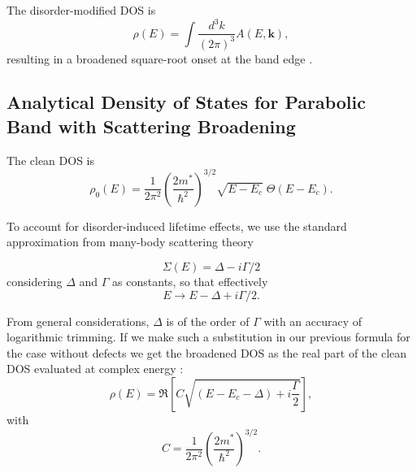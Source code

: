 

The disorder-modified DOS is
\begin{equation}
\rho(E) =
\int \frac{d^3 k}{(2\pi)^3} A(E,\mathbf{k}),
\end{equation}
resulting in a broadened square-root onset at the band edge \cite{YuCardona2010}.


\subsection{Analytical Density of States for Parabolic Band with Scattering Broadening}
\label{subsec:DOS_broadened}

The clean DOS is \cite{YuCardona2010}
\begin{equation}
\label{eq:rho0_clean}
\rho_0(E)
=
\frac{1}{2\pi^2}
\left( \frac{2 m^\ast}{\hbar^2} \right)^{3/2}
\sqrt{E - E_c}
\;\Theta(E - E_c).
\end{equation}

To account for disorder-induced lifetime effects, we use the standard approximation from many-body scattering theory 
\cite{Mahan2000,Economou2006}

\[
\Sigma(E) = \Delta - i \Gamma/2 
\]
considering $\Delta$ and $\Gamma$ as constants, so that effectively
\[
E \rightarrow E - \Delta + i \Gamma/2.
\]



From general considerations, $\Delta$ is of the order of $\Gamma$ with an accuracy of logarithmic trimming. If we make such a substitution in our previous formula for the case without defects we get the broadened DOS as the real part of the clean DOS evaluated at complex energy \cite{Mahan2000}:
\begin{equation}
\label{eq:rho_broad_def}
\rho(E) = 
\Re\!\left[
C \sqrt{(E - E_c - \Delta) + i\frac{\Gamma}{2}}
\right],
\end{equation}
with
\[
C =
\frac{1}{2\pi^2}
\left(\frac{2 m^\ast}{\hbar^2}\right)^{3/2}.
\]

